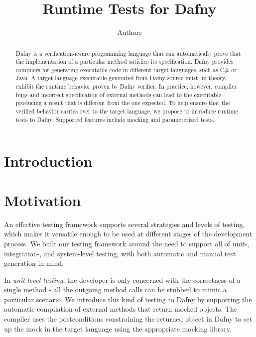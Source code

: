\documentclass[runningheads]{llncs}
\begin{document}
 

\title{Runtime Tests for Dafny}
\author{Authors}

\maketitle  
\begin{abstract}
Dafny is a verification-aware programming language that can automatically prove that the implementation of a particular method satisfies its specification. 
Dafny provides compilers for generating executable code in different target languages, such as C\# or Java. 
A target-language executable generated from Dafny source must, in theory, exhibit the runtime behavior proven by Dafny verifier. 
In practice, however, compiler bugs and incorrect specification of external methods can lead to the executable producing a result that is different from the one expected. 
To help ensure that the verified behavior carries over to the target language, we propose to introduce runtime tests to Dafny. 
Supported features include mocking and parameterized tests.
\end{abstract}

\setcounter{footnote}{0} 


\section{Introduction}

\section{Motivation}
\label{motivation}

An effective testing framework supports several strategies and levels of testing, which makes it versatile enough to be used at different stages of the development process. 
We built our testing framework around the need to support all of unit\nobreakdash-, integration\nobreakdash-, and system\nobreakdash-level testing, with both automatic and manual test generation in mind.

In \textit{unit-level testing}, the developer is only concerned with the correctness of a single method - all the outgoing method calls can be stubbed to mimic a particular scenario. 
We introduce this kind of testing to Dafny by supporting the automatic compilation of external methods that return mocked objects. 
The compiler uses the postconditions constraining the returned object in Dafny to set up the mock in the target language using the appropriate mocking library.
\end{document}
